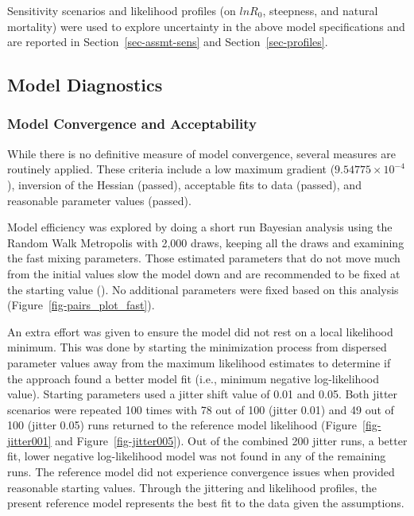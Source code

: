 \documentclass[
]{article}
\begin{document}
Sensitivity scenarios and likelihood profiles (on \(lnR_0\), steepness,
and natural mortality) were used to explore uncertainty in the above
model specifications and are reported in Section~\ref{sec-assmt-sens}
and Section~\ref{sec-profiles}.

\newpage{}

\subsection{Model Diagnostics}\label{model-diagnostics}

\subsubsection{Model Convergence and
Acceptability}\label{sec-model-convergence}

While there is no definitive measure of model convergence, several
measures are routinely applied. These criteria include a low maximum
gradient (\ensuremath{9.54775\times 10^{-4}}), inversion of the Hessian
(passed), acceptable fits to data (passed), and reasonable parameter
values (passed).

Model efficiency was explored by doing a short run Bayesian analysis
using the Random Walk Metropolis with 2,000 draws, keeping all the draws
and examining the fast mixing parameters. Those estimated parameters
that do not move much from the initial values slow the model down and
are recommended to be fixed at the starting value
(). No
additional parameters were fixed based on this analysis
(Figure~\ref{fig-pairs_plot_fast}).

An extra effort was given to ensure the model did not rest on a local
likelihood minimum. This was done by starting the minimization process
from dispersed parameter values away from the maximum likelihood
estimates to determine if the approach found a better model fit (i.e.,
minimum negative log-likelihood value). Starting parameters used a
jitter shift value of 0.01 and 0.05. Both jitter scenarios were repeated
100 times with 78 out of 100 (jitter 0.01) and 49 out of 100 (jitter
0.05) runs returned to the reference model likelihood
(Figure~\ref{fig-jitter001} and Figure~\ref{fig-jitter005}). Out of the
combined 200 jitter runs, a better fit, lower negative log-likelihood
model was not found in any of the remaining runs. The reference model
did not experience convergence issues when provided reasonable starting
values. Through the jittering and likelihood profiles, the present
reference model represents the best fit to the data given the
assumptions.
\end{document}
